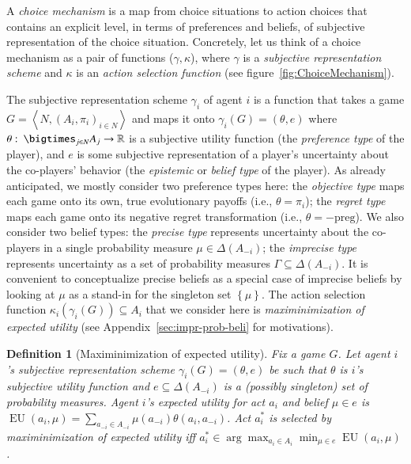 \documentclass[fleqn,reqno,12pt]{article}
\theoremstyle{Satz}
\newtheorem{definition}[theorem]{Definition}
\theoremstyle{Bsp}
\newcommand{\set}[1]{\left\{#1\right\}}
\newcommand{\tuple}[1]{\left \langle #1\right\rangle}
\newcommand{\mycolon}{\ensuremath{\thinspace \colon \thinspace}}
\newcommand{\Acts}{\ensuremath{A}\xspace}		%
\newcommand{\EU}{\ensuremath{\operatorname{EU}}} %
\begin{document}
A \emph{choice mechanism} is a map from choice situations to action choices that contains an explicit level, in terms of preferences and beliefs, of subjective representation of
the choice situation. Concretely, let us think of a choice mechanism as a pair of functions
($\gamma,\kappa$), where $\gamma$ is a \emph{subjective representation scheme} and $\kappa$ is
an \emph{action selection function} (see figure~\ref{fig:ChoiceMechanism}).

The subjective representation scheme $\gamma_i$ of agent $i$ is a function that
takes a game $G = \tuple{ N, (A_i , \pi_i)_{i \in N} }$ and maps it onto
$\gamma_i(G) = (\theta, e)$ where
$\theta \mycolon \bigtimes_{j \in N} A_j \rightarrow \mathbb{R}$ is a subjective utility function (the \emph{preference type} of the player), and $e$ is some subjective representation of a player's uncertainty about the co-players'
behavior (the \emph{epistemic} or \emph{belief type} of the player). As already anticipated, we mostly consider two preference types here: the \emph{objective type} maps each game
onto its own, true evolutionary payoffs (i.e., $ \theta = \pi_i $); the \emph{regret type} maps each game onto its negative regret
transformation (i.e., $ \theta = -\text{preg} $). We also consider two belief types: the
\emph{precise type} represents uncertainty about the co-players in a single probability measure
$\mu \in \Delta(\Acts_{-i})$; the \emph{imprecise type}
represents uncertainty as a set of probability measures $\Gamma \subseteq \Delta(\Acts_{-i})$.
It is convenient to conceptualize precise beliefs as a special case of imprecise beliefs by
looking at $\mu$ as a stand-in for the singleton set $\set{\mu}$.
The action selection function $\kappa_i(\gamma_i(G)) \subseteq A_i$ that we consider here is \emph{maximinimization of expected utility} (see Appendix~\ref{sec:impr-prob-beli} for motivations).

\begin{definition}[Maximinimization of expected utility]
  \label{def:maxminSEU}
  Fix a game $G$. Let agent $i$'s subjective representation scheme
  $\gamma_i(G) = (\theta, e)$ be such that $\theta$ is $i$'s subjective utility function and $e \subseteq \Delta(\Acts_{-i})$ is a (possibly singleton) set of probability measures. Agent $i$'s expected utility for act $a_{i}$ and belief
  $\mu \in e$ is
  $\EU(a_{i}, \mu) = \sum_{a_{-i} \in \Acts_{-i}} \mu(a_{-i}) \theta(a_{i},
  a_{-i})$.
  Act $a_{i}^*$ is selected by maximinimization of expected utility iff
  $a_{i}^* \in \arg \max_{a_{i} \in \Acts_{i}} \min_{\mu \in e} \EU(a_{i}, \mu)$.
\end{definition}
\end{document}
